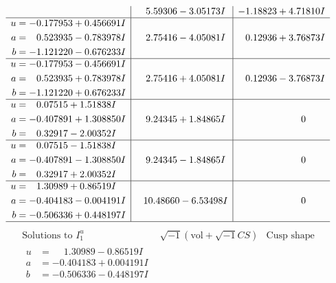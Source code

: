 \documentclass[1p]{elsarticle_modified}
\theoremstyle{definition}
\newcommand{\I}{\sqrt{-1}}
\begin{document}
$$\begin{array}{c|c|c}
 & \phantom{-}5.59306 - 3.05173 I & -1.18823 + 4.71810 I \\ \hline\begin{aligned}
u &= -0.177953 + 0.456691 I \\
a &= \phantom{-}0.523935 - 0.783978 I \\
b &= -1.121220 - 0.676233 I\end{aligned}
 & \phantom{-}2.75416 - 4.05081 I & \phantom{-}0.12936 + 3.76873 I \\ \hline\begin{aligned}
u &= -0.177953 - 0.456691 I \\
a &= \phantom{-}0.523935 + 0.783978 I \\
b &= -1.121220 + 0.676233 I\end{aligned}
 & \phantom{-}2.75416 + 4.05081 I & \phantom{-}0.12936 - 3.76873 I \\ \hline\begin{aligned}
u &= \phantom{-}0.07515 + 1.51838 I \\
a &= -0.407891 + 1.308850 I \\
b &= \phantom{-}0.32917 - 2.00352 I\end{aligned}
 & \phantom{-}9.24345 + 1.84865 I & \phantom{-0.000000 } 0 \\ \hline\begin{aligned}
u &= \phantom{-}0.07515 - 1.51838 I \\
a &= -0.407891 - 1.308850 I \\
b &= \phantom{-}0.32917 + 2.00352 I\end{aligned}
 & \phantom{-}9.24345 - 1.84865 I & \phantom{-0.000000 } 0 \\ \hline\begin{aligned}
u &= \phantom{-}1.30989 + 0.86519 I \\
a &= -0.404183 - 0.004191 I \\
b &= -0.506336 + 0.448197 I\end{aligned}
 & \phantom{-}10.48660 - 6.53498 I & \phantom{-0.000000 } 0\\
 \hline 
 \end{array}$$\newpage$$\begin{array}{c|c|c}  
\text{Solutions to }I^u_{1}& \I (\text{vol} + \sqrt{-1}CS) & \text{Cusp shape}\\
 \hline 
\begin{aligned}
u &= \phantom{-}1.30989 - 0.86519 I \\
a &= -0.404183 + 0.004191 I \\
b &= -0.506336 - 0.448197 I\end{aligned}

\end{array}$$
\end{document}
